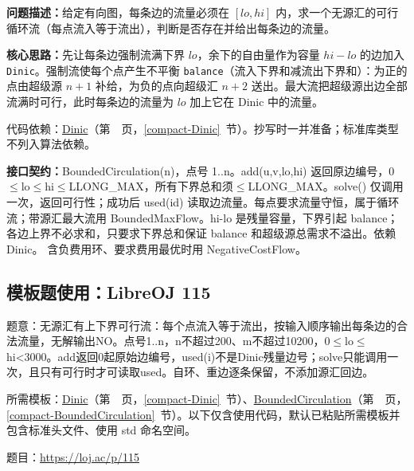 \noindent\textbf{问题描述：}\allowbreak 给定有向图，每条边的流量必须在 $[lo,hi]$ 内，求一个无源汇的可行循环流（每点流入等于流出），判断是否存在并给出每条边的流量。

\textbf{核心思路：}\allowbreak 先让每条边强制流满下界 $lo$，余下的自由量作为容量 $hi-lo$ 的边加入 \texttt{Dinic}。强制流使每个点产生不平衡 \texttt{balance}（流入下界和减流出下界和）：为正的点由超级源 $n+1$ 补给，为负的点向超级汇 $n+2$ 送出。最大流把超级源出边全部流满时可行，此时每条边的流量为 $lo$ 加上它在 Dinic 中的流量。

代码依赖：\hyperref[compact-Dinic]{Dinic}（第~\pageref{compact-Dinic}~页，\ref{compact-Dinic}~节）。抄写时一并准备；标准库类型不列入算法依赖。

{\sloppy{}\noindent\textbf{接口契约：}BoundedCirculation(n)，点号 1..n。add(u,v,lo,hi) 返回原边编号，0$\le$lo$\le$hi$\le$LLONG\_MAX，所有下界总和须$\le$LLONG\_MAX。solve() 仅调用一次，返回可行性；成功后 used(id) 读取边流量。每点要求流量守恒，属于循环流；带源汇最大流用 BoundedMaxFlow。hi-lo 是残量容量，下界引起 balance；各边上界不必求和，只要求下界总和保证 balance 和超级源总需求不溢出。依赖 Dinic。 含负费用环、要求费用最优时用 NegativeCostFlow。\par}



\Needspace{435pt}

\subsection*{模板题使用：LibreOJ 115}

\label{usage-example-185}

题意：无源汇有上下界可行流：每个点流入等于流出，按输入顺序输出每条边的合法流量，无解输出NO。点号1..n，n不超过200、m不超过10200，0$\le$lo$\le$hi<3000。add返回0起原始边编号，used(i)不是Dinic残量边号；solve只能调用一次，且只有可行时才可读取used。自环、重边逐条保留，不添加源汇回边。

所需模板：\hyperref[compact-Dinic]{Dinic}（第~\pageref{compact-Dinic}~页，\ref{compact-Dinic}~节）、\hyperref[compact-BoundedCirculation]{BoundedCirculation}（第~\pageref{compact-BoundedCirculation}~页，\ref{compact-BoundedCirculation}~节）。以下仅含使用代码，默认已粘贴所需模板并包含标准头文件、使用 std 命名空间。

题目：\url{https://loj.ac/p/115}



